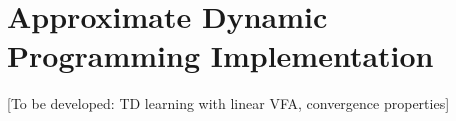 \chapter{Approximate Dynamic Programming Implementation}
\label{chap:adp}

[To be developed: TD learning with linear VFA, convergence properties]